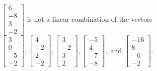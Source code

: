 \begin{exercise}
\begin{exerciseStatement}
  \end{exerciseStatement}
  \begin{exerciseAnswer}
   \(\left[\begin{array}{c}
6 \\
-8 \\
3 \\
-2
\end{array}\right]\) 
  	 is not  
	a linear combination of the vectors \(\left[\begin{array}{c}
3 \\
0 \\
-5 \\
-2
\end{array}\right] , \left[\begin{array}{c}
4 \\
-2 \\
2 \\
-2
\end{array}\right] , \left[\begin{array}{c}
3 \\
-2 \\
3 \\
2
\end{array}\right] , \left[\begin{array}{c}
-5 \\
4 \\
-7 \\
-8
\end{array}\right] , \text{ and } \left[\begin{array}{c}
-16 \\
8 \\
-6 \\
-2
\end{array}\right]\).

	
  


  \end{exerciseAnswer}
\end{exercise}